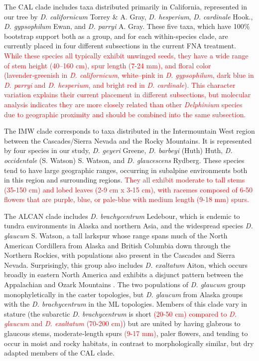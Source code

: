 \documentclass[11pt]{article}
\begin{document}
% 
The CAL clade includes taxa distributed primarily in California, represented in our
tree by \emph{D. californicum} Torrey \& A. Gray, \emph{D. hesperium}, \emph{D. cardinale} Hook., 
\emph{D. gypsophilum} Ewan, and \emph{D. parryi} A. Gray. 
These five taxa, which have 100\% bootstrap support both as a group, and for each within-species clade, are currently placed in four different 
subsections in the current FNA treatment. \textcolor{red}{While these species all typically exhibit unwinged seeds, they have a wide range of stem height (40–160 cm), spur length (7-24 mm), and floral color (lavender‑greenish in \emph{D. californicum}, white–pink in \emph{D. gypsophilum}, dark blue in \emph{D. parryi} and \emph{D. hesperium}, and bright red in \emph{D. cardinale}). This character variation explains their current placement in different subsections, but molecular analysis indicates they are more closely related than other \textit{Delphinium} species due to geographic proximity and should be combined into the same subsection.}


The IMW clade corresponds to taxa distributed in the Intermountain West region 
between the Cascades/Sierra Nevada and the Rocky Mountains.
It is represented by four species in our study, 
\emph{D. geyeri} Greene, \emph{D. barbeyi} (Huth) Huth, \emph{D. occidentale} (S. Watson) S. Watson, and \emph{D. glaucescens} Rydberg.
These species tend to have large geographic ranges, occurring in subalpine
environments both in this region and surrounding regions.
% 
\textcolor{red}{They all exhibit moderate to tall stems (35-150 cm) and lobed leaves (2-9 cm x 3-15 cm), with racemes composed of 6-50 flowers that are purple, blue, or pale-blue with medium length (9-18 mm) spurs.} 

The ALCAN clade includes \emph{D. brachycentrum} Ledebour, which is endemic to tundra environments in Alaska and northern Asia, and the widespread species \emph{D. glaucum} S. Watson, a tall larkspur whose range spans much of the North American Cordillera from Alaska and British Columbia down through the Northern Rockies, with populations also present in the Cascades and Sierra Nevada. 
Surprisingly, this group also includes \emph{D. exaltatum} Aiton, which occurs broadly in eastern North America and exhibits a disjunct pattern between the Appalachian and Ozark Mountains \citep{mohn2021exaltatum}. The two populations of \emph{D. glaucum} group monophyletically in the caster topologies, 
but \emph{D. glaucum} from Alaska groups with the \emph{D. brachycentrum} in the ML topologies.
Members of this clade vary in stature (the subarctic \emph{D. brachycentrum} is short \textcolor{red}{(20-50 cm) compared to \emph{D. glaucum} and \emph{D. exaltatum} (70-200 cm)}) 
but are united by having glabrous to glaucous stems, moderate‑length spurs \textcolor{red}{(9-17 mm)}, 
paler flowers, and tending to occur in moist and rocky habitats, in contrast to 
morphologically similar, but dry adapted members of the CAL clade.
\end{document}
